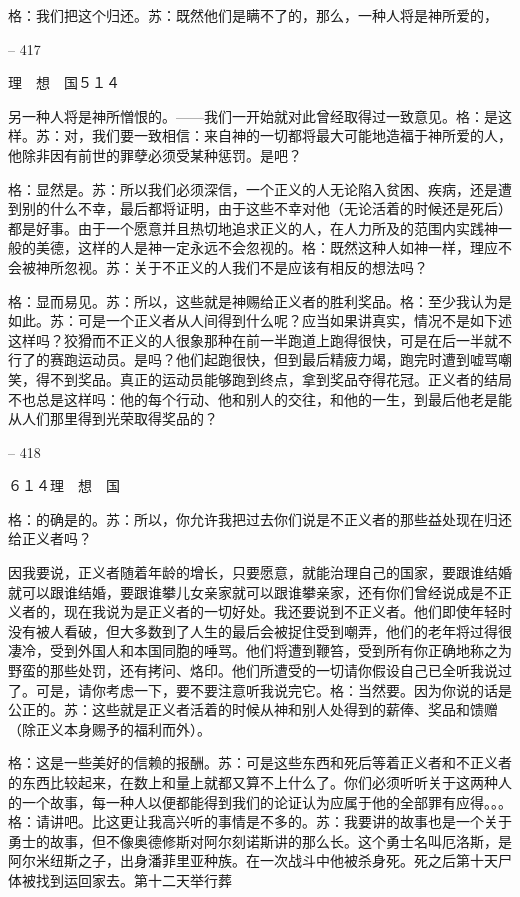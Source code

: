 \documentclass[11pt,oneside]{book}
\begin{document}
\begin{common-format}
    格：我们把这个归还。苏：既然他们是瞒不了的，那么，一种人将是神所爱的，

    

-- 417

    理　想　国５１４

    另一种人将是神所憎恨的。——我们一开始就对此曾经取得过一致意见。格：是这样。苏：对，我们要一致相信：来自神的一切都将最大可能地造福于神所爱的人，他除非因有前世的罪孽必须受某种惩罚。是吧？

    格：显然是。苏：所以我们必须深信，一个正义的人无论陷入贫困、疾病，还是遭到别的什么不幸，最后都将证明，由于这些不幸对他（无论活着的时候还是死后）都是好事。由于一个愿意并且热切地追求正义的人，在人力所及的范围内实践神一般的美德，这样的人是神一定永远不会忽视的。格：既然这种人如神一样，理应不会被神所忽视。苏：关于不正义的人我们不是应该有相反的想法吗？

    格：显而易见。苏：所以，这些就是神赐给正义者的胜利奖品。格：至少我认为是如此。苏：可是一个正义者从人间得到什么呢？应当如果讲真实，情况不是如下述这样吗？狡猾而不正义的人很象那种在前一半跑道上跑得很快，可是在后一半就不行了的赛跑运动员。是吗？他们起跑很快，但到最后精疲力竭，跑完时遭到嘘骂嘲笑，得不到奖品。真正的运动员能够跑到终点，拿到奖品夺得花冠。正义者的结局不也总是这样吗：他的每个行动、他和别人的交往，和他的一生，到最后他老是能从人们那里得到光荣取得奖品的？

    

-- 418

    ６１４理　想　国

    格：的确是的。苏：所以，你允许我把过去你们说是不正义者的那些益处现在归还给正义者吗？

    因我要说，正义者随着年龄的增长，只要愿意，就能治理自己的国家，要跟谁结婚就可以跟谁结婚，要跟谁攀儿女亲家就可以跟谁攀亲家，还有你们曾经说成是不正义者的，现在我说为是正义者的一切好处。我还要说到不正义者。他们即使年轻时没有被人看破，但大多数到了人生的最后会被捉住受到嘲弄，他们的老年将过得很凄冷，受到外国人和本国同胞的唾骂。他们将遭到鞭笞，受到所有你正确地称之为野蛮的那些处罚，还有拷问、烙印。他们所遭受的一切请你假设自己已全听我说过了。可是，请你考虑一下，要不要注意听我说完它。格：当然要。因为你说的话是公正的。苏：这些就是正义者活着的时候从神和别人处得到的薪俸、奖品和馈赠（除正义本身赐予的福利而外）。

    格：这是一些美好的信赖的报酬。苏：可是这些东西和死后等着正义者和不正义者的东西比较起来，在数上和量上就都又算不上什么了。你们必须听听关于这两种人的一个故事，每一种人以便都能得到我们的论证认为应属于他的全部罪有应得。。。格：请讲吧。比这更让我高兴听的事情是不多的。苏：我要讲的故事也是一个关于勇士的故事，但不像奥德修斯对阿尔刻诺斯讲的那么长。这个勇士名叫厄洛斯，是阿尔米纽斯之子，出身潘菲里亚种族。在一次战斗中他被杀身死。死之后第十天尸体被找到运回家去。第十二天举行葬


\end{common-format}
\end{document}
